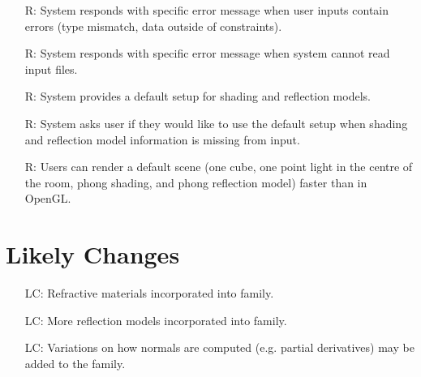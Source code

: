 \documentclass[12pt]{article}
\newcounter{reqnum} %
\newcounter{lcnum} %
\begin{document}
\noindent \begin{itemize}	
	\item[R\refstepcounter{reqnum}\thereqnum \label{NFR_Errors}:]System 
	responds with specific error message when user inputs contain errors (type 
	mismatch, data outside of constraints).
	\item[R\refstepcounter{reqnum}\thereqnum \label{NFR_Errors2}:]System 
	responds with specific error message when system cannot read input files.
	\item[R\refstepcounter{reqnum}\thereqnum \label{NFR_Default}:]System 
	provides a default setup for shading and reflection models.
	\item[R\refstepcounter{reqnum}\thereqnum \label{NFR_Default2}:]	System asks 
	user if they would like to use the default setup when shading and 
	reflection model information is missing from input.
	\item[R\refstepcounter{reqnum}\thereqnum \label{NFR_Usability}:]Users can 
	render a default scene (one cube, one point light in the centre of the 
	room, phong shading, and phong reflection model) faster than in OpenGL.
\end{itemize}

\section{Likely Changes}    

\noindent \begin{itemize}

\item[LC\refstepcounter{lcnum}\thelcnum\label{LC_refraction}:] Refractive 
materials incorporated into family.
\item[LC\refstepcounter{lcnum}\thelcnum\label{LC_reflection_models}:] More 
reflection models incorporated into family.
\item[LC\refstepcounter{lcnum}\thelcnum\label{LC_normals}:] Variations on how 
normals are computed (e.g. partial derivatives) may be added to the family.

\end{itemize}
\end{document}
